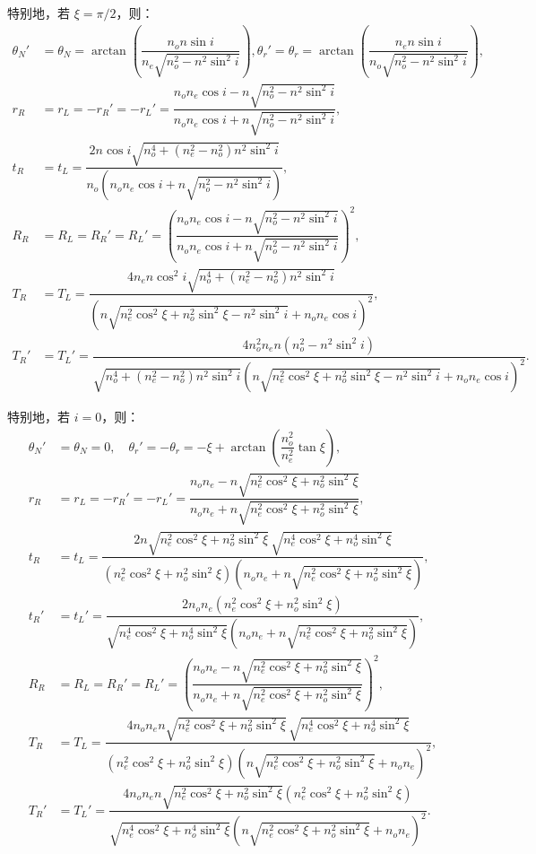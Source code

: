 特别地，若 \(\xi = \pi/2\)，则：
\begin{align*}
	\theta_N' &= \theta_N = \arctan\left( \dfrac{n_o n \sin i}{n_e \sqrt{n_o^2 - n^2 \sin^2 i}} \right),
	\theta_r'= \theta_r = \arctan\left( \dfrac{n_e n \sin i}{n_o \sqrt{n_o^2 - n^2 \sin^2 i}} \right),\\
	r_R &= r_L = -r_R' = -r_L' = \dfrac{n_o n_e \cos i - n \sqrt{n_o^2 - n^2 \sin^2 i}}{n_o n_e \cos i + n \sqrt{n_o^2 - n^2 \sin^2 i}},\\
	t_R &= t_L = \dfrac{2 n \cos i \sqrt{n_o^4 + (n_e^2 - n_o^2) n^2 \sin^2 i}}{n_o \left( n_o n_e \cos i + n \sqrt{n_o^2 - n^2 \sin^2 i} \right)},\\
	R_R &= R_L = R_R' = R_L' = \left( \dfrac{n_o n_e \cos i - n \sqrt{n_o^2 - n^2 \sin^2 i}}{n_o n_e \cos i + n \sqrt{n_o^2 - n^2 \sin^2 i}} \right)^2,\\
	T_R &= T_L = \dfrac{4 n_e n \cos^2 i \sqrt{n_o^4 + (n_e^2 - n_o^2) n^2 \sin^2 i}}{\left( n \sqrt{n_e^2 \cos^2\xi + n_o^2 \sin^2\xi - n^2 \sin^2 i} + n_o n_e \cos i \right)^2},\\
	T_R' &= T_L' = \dfrac{4 n_o^2 n_e n (n_o^2 - n^2 \sin^2 i)}{\sqrt{n_o^4 + (n_e^2 - n_o^2) n^2 \sin^2 i} \left( n \sqrt{n_e^2 \cos^2\xi + n_o^2 \sin^2\xi - n^2 \sin^2 i} + n_o n_e \cos i \right)^2}.
\end{align*}

特别地，若 \(i = 0\)，则：
\begin{align*}
	\theta_N' &= \theta_N = 0, \quad \theta_r' = -\theta_r = -\xi + \arctan\left( \dfrac{n_o^2}{n_e^2} \tan\xi \right),\\
	r_R &= r_L = -r_R' = -r_L' = \dfrac{n_o n_e - n \sqrt{n_e^2 \cos^2\xi + n_o^2 \sin^2\xi}}{n_o n_e + n \sqrt{n_e^2 \cos^2\xi + n_o^2 \sin^2\xi}},\\
	t_R &= t_L = \dfrac{2 n \sqrt{n_e^2 \cos^2\xi + n_o^2 \sin^2\xi}\,\sqrt{n_e^4 \cos^2\xi + n_o^4 \sin^2\xi}}{\left( n_e^2 \cos^2\xi + n_o^2 \sin^2\xi \right) \left( n_o n_e + n \sqrt{n_e^2 \cos^2\xi + n_o^2 \sin^2\xi} \right)},\\
	t_R' &= t_L' = \dfrac{2 n_o n_e \left( n_e^2 \cos^2\xi + n_o^2 \sin^2\xi \right)}{\sqrt{n_e^4 \cos^2\xi + n_o^4 \sin^2\xi} \left( n_o n_e + n \sqrt{n_e^2 \cos^2\xi + n_o^2 \sin^2\xi} \right)},\\
	R_R &= R_L = R_R' = R_L' = \left( \dfrac{n_o n_e - n \sqrt{n_e^2 \cos^2\xi + n_o^2 \sin^2\xi}}{n_o n_e + n \sqrt{n_e^2 \cos^2\xi + n_o^2 \sin^2\xi}} \right)^2,\\
	T_R &= T_L = \dfrac{4 n_o n_e n \sqrt{n_e^2 \cos^2\xi + n_o^2 \sin^2\xi}\,\sqrt{n_e^4 \cos^2\xi + n_o^4 \sin^2\xi}}{\left( n_e^2 \cos^2\xi + n_o^2 \sin^2\xi \right) \left( n \sqrt{n_e^2 \cos^2\xi + n_o^2 \sin^2\xi} + n_o n_e \right)^2},\\
	T_R' &= T_L' = \dfrac{4 n_o n_e n \sqrt{n_e^2 \cos^2\xi + n_o^2 \sin^2\xi} \left( n_e^2 \cos^2\xi + n_o^2 \sin^2\xi \right)}{\sqrt{n_e^4 \cos^2\xi + n_o^4 \sin^2\xi} \left( n \sqrt{n_e^2 \cos^2\xi + n_o^2 \sin^2\xi} + n_o n_e \right)^2}.
\end{align*}
